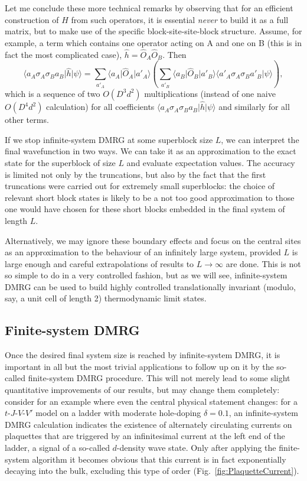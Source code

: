 \documentclass[a4paper,10pt,oneside,onecolumn,1p,times]{elsarticle}
\newcommand{\bra}[1]{\mbox{$\langle #1  |$}}
\newcommand{\ket}[1]{\mbox{$| #1  \rangle$}}
\newcommand{\braket}[2]{\mbox{$\langle #1  | #2 \rangle$}} 	%
\begin{document}
Let me conclude these more technical remarks by observing that for an efficient construction of  $\hat{H}$ from such operators, it is essential {\em never} to build it as a full matrix, but to make use of the specific block-site-site-block structure. Assume, for example, a term which contains one operator acting on A and one on B (this is in fact the most complicated case), $\hat{h}=\hat{O}_A \hat{O}_B$. Then
\begin{equation}
\bra{a_A \sigma_A \sigma_B a_B} \hat{h}\ket{\psi} = \sum_{a'_A} 
\bra{a_A}\hat{O}_A\ket{a'_A} \left( \sum_{a'_B} \bra{a_B}\hat{O}_B\ket{a'_B}  \braket{a'_A \sigma_A \sigma_B a'_B}{\psi} \right),
\label{eq:hamfragment}
\end{equation}
which is a sequence of two $O(D^3 d^2)$ multiplications (instead of one naive $O( D^4 d^2)$ calculation) for all coefficients $\bra{a_A \sigma_A \sigma_B a_B} \hat{h}\ket{\psi}$ and similarly for all other terms.

If we stop infinite-system DMRG at some superblock size $L$, we can interpret the final wavefunction in two ways. We can take it as an approximation to the exact state for the superblock of size $L$ and evaluate expectation values. The accuracy is limited not only by the truncations, but also by the fact that the first truncations were carried out for extremely small superblocks: the choice of relevant short block states is likely to be a not too good approximation to those one would have chosen for these short blocks embedded in the final system of length $L$.

Alternatively, we may ignore these boundary effects and focus on the central sites as an approximation to the behaviour of an infinitely large system, provided $L$ is large enough and careful extrapolations of results to $L\rightarrow\infty$ are done. This is not so simple to do in a very controlled fashion, but as we will see, infinite-system DMRG can be used to build highly controlled translationally invariant (modulo, say, a unit cell of length 2) thermodynamic limit states.

\subsection{Finite-system DMRG}

Once the desired final system size is reached by infinite-system DMRG, it is important in all but the most trivial applications to follow up on it by the so-called finite-system DMRG procedure. This will not merely lead to some slight quantitative improvements of our results, but may change them completely: consider \cite{Schollwoeck03} for an example where even the central physical statement changes: for a $t$-$J$-$V$-$V'$ model on a ladder with moderate hole-doping $\delta=0.1$, an infinite-system DMRG calculation indicates the existence of alternately circulating currents on plaquettes that are triggered by an infinitesimal current at the left end of the ladder, a signal of a so-called $d$-density wave state. Only after applying the finite-system algorithm it becomes obvious that this current is in fact exponentially decaying into the bulk, excluding this type of order (Fig.~\ref{fig:PlaquetteCurrent}). 
\end{document}
